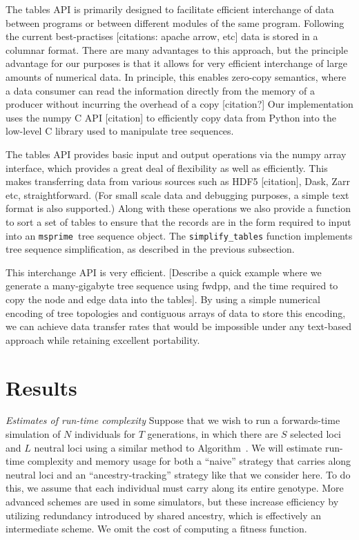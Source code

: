 \documentclass{article}
\newcommand{\msprime}{\texttt{msprime}}
\newcommand{\plr}[1]{{\em \color{blue} #1}}
\begin{document}
The tables API is primarily designed to facilitate efficient interchange of
data between programs or between different modules of the same program.
Following the current best-practises [citations: apache arrow, etc] data is stored
in a columnar format. There are many advantages to this approach, but the
principle advantage for our purposes is that it allows for very efficient
interchange of large amounts of numerical data. In principle, this enables
zero-copy semantics, where a data consumer can read the information directly
from the memory of a producer without incurring the overhead of a copy
[citation?] Our implementation uses the numpy C API [citation] to efficiently copy
data from Python into the low-level C library used to manipulate
tree sequences.

The tables API provides basic input and output operations via the numpy
array interface, which provides a great deal of flexibility as well
as efficiently. This makes transferring data from various sources
such as HDF5 [citation], Dask, Zarr etc, straightforward. (For small
scale data and debugging purposes, a simple text format is also supported.)
Along with
these operations we also provide a function to sort a set of tables
to ensure that the records are in the form required to input
into an \msprime\ tree sequence object. The \texttt{simplify\_tables}
function implements tree sequence simplification, as described in the
previous subsection.

This interchange API is very efficient. [Describe a quick example where we generate
a many-gigabyte tree sequence using fwdpp, and the time required
to copy the node and edge data into the tables]. By using a simple numerical
encoding of tree topologies and contiguous arrays of data to store this
encoding, we can achieve data transfer rates that would be impossible under
any text-based approach while retaining excellent portability.

\section*{Results}

\plr{Estimates of run-time complexity}
Suppose that we wish to run a forwards-time simulation of $N$ individuals for $T$ generations,
in which there are $S$ selected loci and $L$ neutral loci using a similar
method to Algorithm~.
We will estimate run-time complexity and memory usage for both a ``naive'' strategy that carries along neutral loci
and an ``ancestry-tracking'' strategy like that we consider here.
To do this, we assume that each individual must carry along its entire genotype.
More advanced schemes are used in some simulators,
but these increase efficiency by utilizing redundancy introduced by shared ancestry,
which is effectively an intermediate scheme.
We omit the cost of computing a fitness function.
\end{document}
